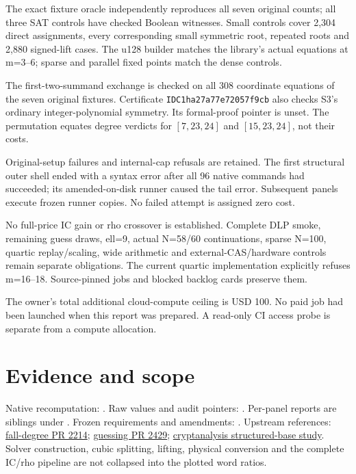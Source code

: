 \documentclass[10pt]{article}
\begin{document}
The exact fixture oracle independently reproduces all seven original counts;
all three SAT controls have checked Boolean witnesses. Small controls cover
2,304 direct assignments, every corresponding small symmetric root, repeated
roots and 2,880 signed-lift cases. The u128 builder matches the library's actual
equations at m=3--6; sparse and parallel fixed points match the dense controls.

The first-two-summand exchange is checked on all 308 coordinate equations of
the seven original fixtures. Certificate \texttt{IDC1ha27a77e72057f9cb} also
checks S3's ordinary integer-polynomial symmetry. Its formal-proof pointer is
unset. The permutation equates degree verdicts for $[7,23,24]$ and $[15,23,24]$,
not their costs.

Original-setup failures and internal-cap refusals are retained. The first
structural outer shell ended with a syntax error after all 96 native commands
had succeeded; its amended-on-disk runner caused the tail error. Subsequent
panels execute frozen runner copies. No failed attempt is assigned zero cost.

No full-price IC gain or rho crossover is established. Complete DLP smoke,
remaining guess draws, ell=9, actual N=58/60 continuations, sparse N=100,
quartic replay/scaling, wide arithmetic and external-CAS/hardware controls
remain separate obligations. The current quartic implementation explicitly
refuses m=16--18. Source-pinned jobs and blocked backlog cards preserve them.

The owner's total additional cloud-compute ceiling is USD 100. No paid job
had been launched when this report was prepared. A read-only CI access probe
is separate from a compute allocation.

\section*{Evidence and scope}
Native recomputation: .
Raw values and audit pointers: . Per-panel
reports are siblings under . Frozen requirements and amendments:
. Upstream references:
\href{https://github.com/aburan28/crypto/pull/2214}{fall-degree PR 2214};
\href{https://github.com/aburan28/crypto/pull/2429}{guessing PR 2429};
\href{https://github.com/aburan28/cryptanalysis/tree/claude/cryptanalysis-repo-setup-p59kek/experiments/pdp-degree-heuristics}{cryptanalysis structured-base study}.
Solver construction, cubic splitting, lifting, physical conversion and the
complete IC/rho pipeline are not collapsed into the plotted word ratios.
\end{document}
